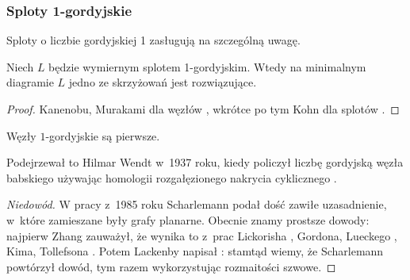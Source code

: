 
\subsubsection{Sploty 1-gordyjskie}
Sploty o liczbie gordyjskiej 1 zasługują na szczególną uwagę.

\begin{proposition}
%
    Niech $L$ będzie wymiernym splotem 1-gordyjskim.
    Wtedy na minimalnym diagramie $L$ jedno ze skrzyżowań jest rozwiązujące.
\end{proposition}

\begin{proof}
%
%
%
    Kanenobu, Murakami dla węzłów \cite{kanenobumurakami1986}, wkrótce po tym Kohn dla splotów \cite{kohn1991}.
\end{proof}

\begin{proposition}
\label{prp:unknotting_one_prime}%
    Węzły $1$-gordyjskie są pierwsze.
\end{proposition}

Podejrzewał to Hilmar Wendt w~1937 roku, kiedy policzył liczbę gordyjską węzła babskiego używając homologii rozgałęzionego nakrycia cyklicznego \cite{wendt1937}.
%

\begin{proof}[Niedowód]
    W pracy \cite{scharlemann1985} z~1985 roku Scharlemann podał dość zawiłe uzasadnienie, w~które zamieszane były grafy planarne.
%
    Obecnie znamy prostsze dowody: najpierw Zhang \cite{zhang1991} zauważył, że wynika to z~prac Lickorisha \cite{lickorish1985}, Gordona, Lueckego \cite{luecke1987}, Kima, Tollefsona \cite{tollefson1980}.
%
%
%
%
%
%
    Potem Lackenby napisał \cite{lackenby1997}: stamtąd wiemy, że Scharlemann powtórzył dowód, tym razem wykorzystując rozmaitości szwowe.
%
%
\end{proof}


